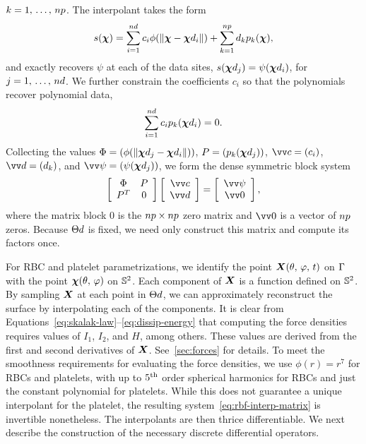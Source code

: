 $k=1,\,\ldots,\,\poly\cardinality$. The interpolant takes the form
\begin{equation}\label{eq:rbf-interp}
    s(\Xp)
    = \sum_{i=1}^{\data\cardinality} c_i \phi(\|\Xp-\data\Xp_i\|)
    + \sum_{k=1}^{\poly\cardinality} d_k p_k(\Xp),
\end{equation}
and exactly recovers $\psi$ at each of the data sites,
$s(\data\Xp_j) = \psi(\data\Xp_i)$, for $j = 1,\,\ldots,\,\data\cardinality$. We further
constrain the coefficients $c_i$ so that the polynomials recover polynomial data,
\begin{equation}
    \sum_{i=1}^{\data\cardinality} c_i p_k(\data\Xp_i) = 0.
    \label{eq:constraints}
\end{equation}
Collecting the values $\Phi=(\phi(\|\data\Xp_j-\data\Xp_i\|))$, $P=(p_k(\data\Xp_j))$,
$\arr{c} = (c_i)$, $\arr{d} = (d_k)$, and $\arr{\psi} = (\psi(\data\Xp_j))$, we form
the dense symmetric block system
\begin{equation}\label{eq:rbf-interp-matrix}
    \left[\begin{array}{cc}
            \Phi & P \\ P^T & 0
    \end{array}\right]\left[\begin{array}{c}
            \arr{c} \\ \arr{d}
    \end{array}\right] = \left[\begin{array}{c}
            \arr{\psi} \\ \arr{0}
    \end{array}\right],
\end{equation}
where the matrix block $0$ is the $\poly\cardinality\times\poly\cardinality$ zero matrix
and $\arr{0}$ is a vector of $\poly\cardinality$ zeros. Because $\data\sites$ is fixed,
we need only construct this matrix and compute its factors once.

For RBC and platelet parametrizations, we identify the point $\boldsymbol{X}(\theta,\,\varphi,\,t)$
on $\Gamma$ with the point $\boldsymbol{\chi}(\theta,\,\varphi)$ on $\mathbb{S}^2$. Each component of
$\boldsymbol{X}$ is a function defined on $\mathbb{S}^2$. By sampling $\boldsymbol{X}$ at each point in $\data\sites$,
we can approximately reconstruct the surface by interpolating each of the components. It
is clear from Equations~\eqref{eq:skalak-law}--\eqref{eq:dissip-energy} that computing
the force densities requires values of $I_1$, $I_2$, and $H$, among others. These values
are derived from the first and second derivatives of $\boldsymbol{X}$. See~\ref{sec:forces} for
details. To meet the smoothness requirements for evaluating the force densities, we use
$\phi(r) = r^7$ for RBCs and platelets, with up to $5\textsuperscript{th}$ order spherical harmonics for
RBCs and just the constant polynomial for platelets. While this does not guarantee a
unique interpolant for the platelet, the resulting system~\eqref{eq:rbf-interp-matrix} is
invertible nonetheless. The interpolants are then thrice differentiable. We next describe
the construction of the necessary discrete differential operators.

